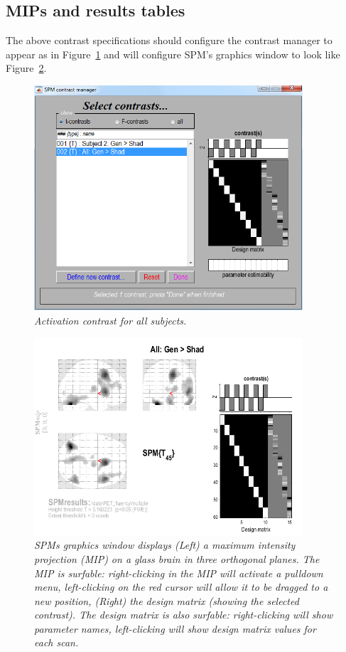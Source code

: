 \subsection{MIPs and results tables}

The above contrast specifications should configure the contrast manager to appear as in Figure~\ref{all} and will configure SPM's graphics window to look like Figure~\ref{all_results}.
\begin{figure}
\begin{center}
\includegraphics[width=100mm]{pet/all}
\caption{\em Activation contrast for all subjects.  \label{all}}
\end{center}
\end{figure}
\begin{figure}
\begin{center}
\includegraphics[width=100mm]{pet/all_results}
\caption{\em SPMs graphics window displays (Left) a maximum intensity projection (MIP) on a glass brain in three orthogonal planes. The MIP is surfable: right-clicking in the MIP will activate a pulldown menu, left-clicking  on the red cursor will allow it to be dragged to a new position, (Right)  the design matrix (showing the selected contrast). The design matrix is also surfable: right-clicking will show parameter names, left-clicking will show design matrix values for each scan. \label{all_results}}
\end{center}
\end{figure}


